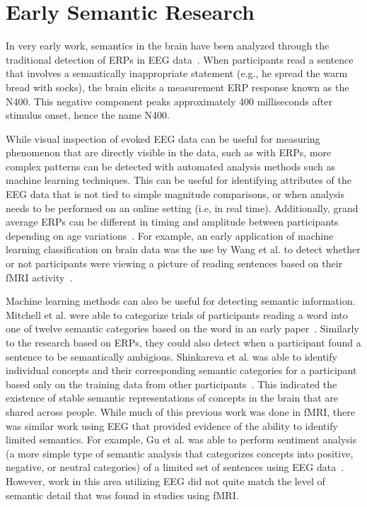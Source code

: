 \label{chapter:relatedwork}

\section{Early Semantic Research}

In very early work, semantics in the brain have been analyzed through the 
traditional detection of ERPs in EEG 
data~\cite{kutas1980reading,kuperberg2007neural}. When participants read a 
sentence that involves a semantically inappropriate statement (e.g., he spread 
the warm bread with socks), the brain elicits a measurement ERP response known 
as the N400. This negative component peaks approximately 400 milliseconds after 
stimulus onset, hence the name N400.

While visual inspection of evoked EEG data can be useful for measuring 
phenomenon that are directly visible in the data, such as with ERPs, more 
complex patterns can be detected with automated analysis methods such as 
machine learning techniques. This can be useful for identifying attributes of 
the EEG data that is not tied to simple magnitude comparisons, or when analysis 
needs to be performed on an online setting (i.e, in real time). Additionally, 
grand average ERPs can be different in timing and amplitude between 
participants depending on age variations~\cite{cunningham2000speech}. For 
example, an early application of machine learning classification on brain data 
was the use by Wang et al. to detect whether or not participants were viewing a 
picture of reading sentences based on their fMRI activity~\cite{Wang2002}. 

Machine learning methods can also be useful for detecting semantic information.  
Mitchell et al. were able to categorize trials of participants reading a word 
into one of twelve semantic categories based on the word in an early 
paper~\cite{Mitchell2002}. Similarly to the research based on ERPs, they could 
also detect when a participant found a sentence to be semantically ambigious. 
Shinkareva et al. was able to identify individual concepts and their 
corresponding semantic categories for a participant based only on the training 
data from other participants~\cite{Shinkareva2008}. This indicated the 
existence of stable semantic representations of concepts in the brain that are 
shared across people. While much of this previous work was done in fMRI, there 
was similar work using EEG that provided evidence of the ability to identify 
limited semantics. For example, Gu et al. was able to perform sentiment 
analysis (a more simple type of semantic analysis that categorizes concepts 
into positive, negative, or neutral categories) of a limited set of sentences 
using EEG data~\cite{Gu2014}. However, work in this area utilizing EEG did not 
quite match the level of semantic detail that was found in studies using fMRI.

